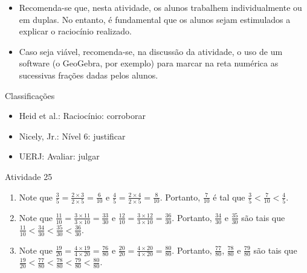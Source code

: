 \begin{multicols}{2}
  
 
\begin{itemize} %
    \item       Recomenda-se que, nesta atividade, os alunos trabalhem 
individualmente ou em duplas. No entanto, é fundamental que os alunos sejam 
estimulados a explicar o raciocínio realizado.
    \item       Caso seja viável, recomenda-se, na discussão da atividade, o uso 
de um software (o GeoGebra, por exemplo) para marcar na reta numérica as 
sucessivas frações dadas pelos alunos. 
\end{itemize} %
  
  
  Classificações  
\begin{itemize} %
    \item       Heid et al.: Raciocínio: corroborar
    \item       Nicely, Jr.: Nível 6: justificar
    \item       UERJ: Avaliar: julgar
\end{itemize} %

\begin{resposta*}{Atividade 25}  
\begin{enumerate} [\quad a)] %
    \item       Note que       $\frac{3}{5} = \frac{2 \times 3}{2 \times 5} = 
\frac{6}{10}$       e       $\frac{4}{5} = \frac{2 \times 4}{2 \times 5} = 
\frac{8}{10}$. Portanto,       $\frac{7}{10}$       é tal que       $\frac{3}{5} 
< \frac{7}{10} < \frac{4}{5}$.
    \item       Note que       $\frac{11}{10} = \frac{3 \times 11}{3 \times 10} 
= \frac{33}{30}$       e       $\frac{12}{10} = \frac{3 \times 12}{3 \times 10} 
= \frac{36}{30}$. Portanto,       $\frac{34}{30}$       e       $\frac{35}{30}$  
     são tais que       $\frac{11}{10} < \frac{34}{30} < \frac{35}{30} < 
\frac{36}{30}$.
    \item       Note que       $\frac{19}{20} = \frac{4 \times 19}{4 \times 20} 
= \frac{76}{80}$       e       $\frac{20}{20} = \frac{4 \times 20}{4 \times 20} 
= \frac{80}{80}$. Portanto,       $\frac{77}{80}$,       $\frac{78}{80}$       e 
      $\frac{79}{80}$       são tais que       $\frac{19}{20} < \frac{77}{80} < 
\frac{78}{80} < \frac{79}{80} < \frac{80}{80}$.
\end{enumerate} %
  
\end{resposta*}
\Bg
\Bg


\end{multicols}
